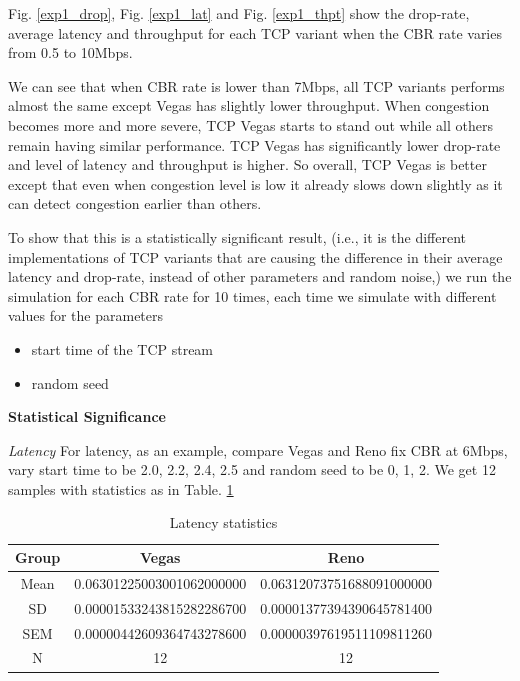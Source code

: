 \documentclass[10pt, conference]{IEEEtran/IEEEtran}
\begin{document}
Fig. \ref{exp1_drop}, Fig. \ref{exp1_lat} and Fig. \ref{exp1_thpt} show the drop-rate, average latency and throughput for each TCP variant when the CBR rate varies from 0.5 to 10Mbps. 

We can see that when CBR rate is lower than 7Mbps, all TCP variants performs almost the same except Vegas has slightly lower throughput. When congestion becomes more and more severe, TCP Vegas starts to stand out while all others remain having similar performance. TCP Vegas has significantly lower drop-rate and level of latency and throughput is higher. So overall, TCP Vegas is better except that even when congestion level is low it already slows down slightly as it can detect congestion earlier than others\cite{vegas}.

To show that this is a statistically significant result, (i.e., it is the different implementations of TCP variants that are causing the difference in their average latency and drop-rate, instead of other parameters and random noise,) we run the simulation for each CBR rate for 10 times, each time we simulate with different values for the parameters

\begin{itemize}
\item start time of the TCP stream
\item random seed
\end{itemize}

\textbf{Statistical Significance}

\textit{Latency}
 For latency, as an example, compare Vegas and Reno fix CBR at 6Mbps, vary start time to be 2.0, 2.2, 2.4, 2.5 and random seed to be 0, 1, 2.
We get 12 samples with statistics as in Table. \ref{lat}

\begin{table}[h]
\caption{Latency statistics}
\begin{center}
\begin{tabular}{|c|c|c|}
Group &	  Vegas  &	  Reno \\
\hline
Mean	& 0.06301225003001062000000 &	0.06312073751688091000000\\
SD &	0.00001533243815282286700	&0.00001377394390645781400\\
SEM &	0.00000442609364743278600&	0.00000397619511109811260\\
N &	12                 &        	12       \\                  
\end{tabular}
\end{center}
\label{lat}
\end{table}%
\end{document}
